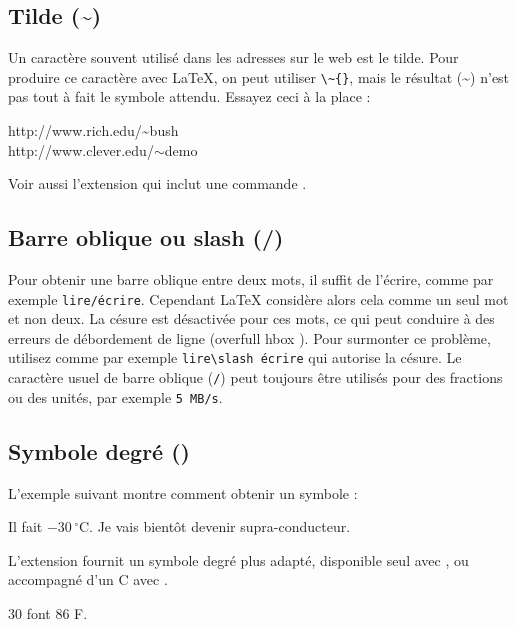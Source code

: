 \subsection{Tilde (\textasciitilde)}
Un caractère souvent utilisé dans les adresses sur le web est le
tilde. Pour produire ce caractère avec \LaTeX{}, on peut utiliser
\verb|\~{}|, mais le résultat (\~{}) n'est pas tout à fait le symbole
attendu. Essayez ceci à la place :

\begin{example}
http://www.rich.edu/\~{}bush \\
http://www.clever.edu/$\sim$demo
\end{example}

Voir aussi l'extension  qui inclut une commande
.

\subsection{Barre oblique ou slash (/)}
Pour obtenir une barre oblique entre deux mots, il suffit de l'écrire,
comme par exemple \texttt{lire/écrire}. Cependant \LaTeX{} considère
alors cela comme un seul mot et non deux. La césure est désactivée
pour ces mots, ce qui peut conduire à des erreurs de débordement de
ligne (\og overfull hbox \fg). Pour surmonter ce problème, utilisez
 comme par exemple \verb|lire\slash écrire| qui autorise la
césure. Le caractère usuel de barre oblique (\texttt{/}) peut toujours
être utilisés pour des fractions ou des unités, par exemple \texttt{5 MB/s}.

\subsection{Symbole degré (\textdegree)}

L'exemple suivant montre comment obtenir un symbole  :

\begin{example}
Il fait $-30\,^{\circ}\mathrm{C}$.
Je vais bient\^ot devenir
supra-conducteur.
\end{example}

L'extension  fournit un symbole degré plus adapté, disponible
seul avec , ou accompagné d'un C avec
.

\begin{example}
30 \textcelsius{} font
86 \textdegree{}F.
\end{example}

